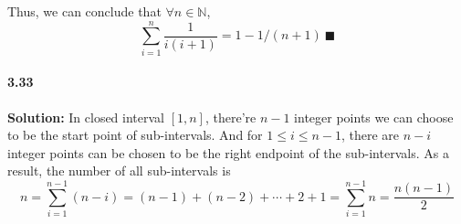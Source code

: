 \documentclass{article}[11pt]
\begin{document}
		Thus, we can conclude that $\forall n \in \mathbb{N}$, \[\sum_{i = 1}^n \frac{1}{i(i+1)} = 1 - 1/(n + 1)\ \blacksquare\]
	\paragraph{3.33}\textbf{Solution:} In closed interval $[1, n]$, there're $n - 1$ integer points we can choose to be the start point of sub-intervals. And for $1 \leq i \leq n - 1$, there are $n - i$ integer points can be chosen to be the right endpoint of the sub-intervals. As a result, the number of all sub-intervals is
	\[n = \sum_{i = 1}^{n - 1} (n - i) = (n - 1) + (n - 2) + \cdots + 2 + 1 = \sum_{i = 1}^{n - 1}n = \frac{n(n - 1)}{2}\]
		
\end{document}
